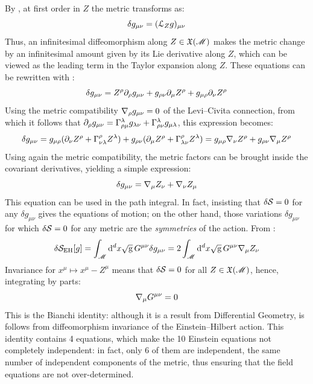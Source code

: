 By , at first order in $ Z $ the metric transforms as:
\begin{equation}
  \delta g_{\mu \nu} = (\EuScript{L}_Z g)_{\mu \nu}
  \label{eq:lie-der-metric}
\end{equation}
Thus, an infinitesimal diffeomorphism along $ Z \in \mathfrak{X}(\mathscr{M}) $ makes the metric change by an infinitesimal amount given by its Lie derivative along $ Z $, which can be viewed as the leading term in the Taylor expansion along $ Z $. These equations can be rewritten with :
\begin{equation*}
  \delta g_{\mu \nu} = Z^\rho \partial_\rho g_{\mu \nu} + g_{\rho \nu} \partial_\mu Z^\rho + g_{\mu \rho} \partial_\nu Z^\rho
\end{equation*}
Using the metric compatibility $ \nabla_\rho g_{\mu \nu} = 0 $ of the Levi--Civita connection, from which it follows that $ \partial_\rho g_{\mu \nu} = \Gamma^\lambda_{\rho \mu} g_{\lambda \nu} + \Gamma^\lambda_{\rho \nu} g_{\mu \lambda} $, this expression becomes:
\begin{equation*}
  \delta g_{\mu \nu} = g_{\mu \rho} ( \partial_\nu Z^\rho + \Gamma^\rho_{\nu \lambda} Z^\lambda ) + g_{\rho \nu} ( \partial_\mu Z^\rho + \Gamma^\rho_{\lambda \nu} Z^\lambda ) = g_{\mu \rho} \nabla_\nu Z^\rho + g_{\rho \nu} \nabla_\mu Z^\rho
\end{equation*}
Using again the metric compatibility, the metric factors can be brought inside the covariant derivatives, yielding a simple expression:
\begin{equation}
  \delta g_{\mu \nu} = \nabla_\mu Z_\nu + \nabla_\nu Z_\mu
  \label{eq:metric-variation}
\end{equation}
This equation can be used in the path integral. In fact, insisting that $ \delta \mathcal{S} = 0 $ for any $ \delta g_{\mu \nu} $ gives the equations of motion; on the other hand, those variations $ \delta g_{\mu \nu} $ for which $ \delta \mathcal{S} = 0 $ for any metric are the \textit{symmetries} of the action. From :
\begin{equation*}
  \delta \mathcal{S}_\text{EH}[g] = \int_\mathscr{M} \mathrm{d}^d x \sqrt{\mathrm{g}}\, G^{\mu \nu} \delta g_{\mu \nu} = 2 \int_\mathscr{M} \mathrm{d}^d x \sqrt{\mathrm{g}}\, G^{\mu \nu} \nabla_\mu Z_\nu
\end{equation*}
Invariance for $ x^\mu \mapsto x^\mu - Z^\mu $ means that $ \delta \mathcal{S} = 0 $ for all $ Z \in \mathfrak{X}(\mathscr{M}) $, hence, integrating by parts:
\begin{equation}
  \nabla_\mu G^{\mu \nu} = 0
  \label{eq:bianchi-id}
\end{equation}
This is the Bianchi identity: although it is a result from Differential Geometry, is follows from diffeomorphism invariance of the Einstein--Hilbert action. This identity contains 4 equations, which make the 10 Einstein equations not completely independent: in fact, only 6 of them are independent, the same number of independent components of the metric, thus ensuring that the field equations are not over-determined.

